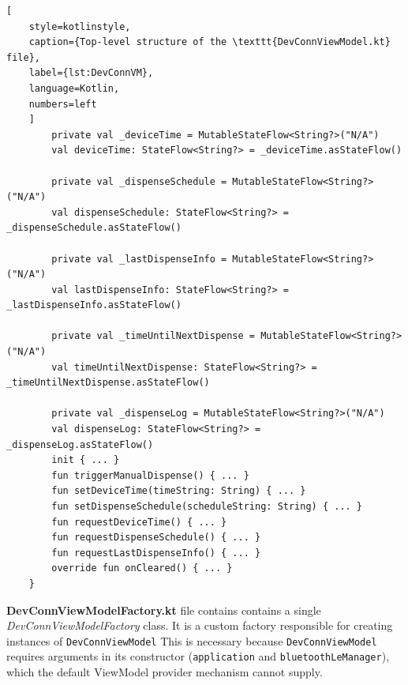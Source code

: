 \begin{lstlisting}[
	style=kotlinstyle,
	caption={Top-level structure of the \texttt{DevConnViewModel.kt} file},
	label={lst:DevConnVM},
	language=Kotlin,
	numbers=left
	]
		private val _deviceTime = MutableStateFlow<String?>("N/A")
		val deviceTime: StateFlow<String?> = _deviceTime.asStateFlow()
		
		private val _dispenseSchedule = MutableStateFlow<String?>("N/A")
		val dispenseSchedule: StateFlow<String?> = _dispenseSchedule.asStateFlow()
		
		private val _lastDispenseInfo = MutableStateFlow<String?>("N/A")
		val lastDispenseInfo: StateFlow<String?> = _lastDispenseInfo.asStateFlow()
		
		private val _timeUntilNextDispense = MutableStateFlow<String?>("N/A")
		val timeUntilNextDispense: StateFlow<String?> = _timeUntilNextDispense.asStateFlow()
		
		private val _dispenseLog = MutableStateFlow<String?>("N/A")
		val dispenseLog: StateFlow<String?> = _dispenseLog.asStateFlow()
		init { ... }
		fun triggerManualDispense() { ... }
		fun setDeviceTime(timeString: String) { ... }
		fun setDispenseSchedule(scheduleString: String) { ... }
		fun requestDeviceTime() { ... }
		fun requestDispenseSchedule() { ... }
		fun requestLastDispenseInfo() { ... }
		override fun onCleared() { ... }
	}
\end{lstlisting}

\textbf{DevConnViewModelFactory.kt} file contains contains a single \textit{DevConnViewModelFactory} class. It is a custom factory responsible for creating instances of \texttt{DevConnViewModel} This is necessary because \texttt{DevConnViewModel} requires arguments in its constructor (\texttt{application} and \texttt{bluetoothLeManager}), which the default ViewModel provider mechanism cannot supply.
\newpage
